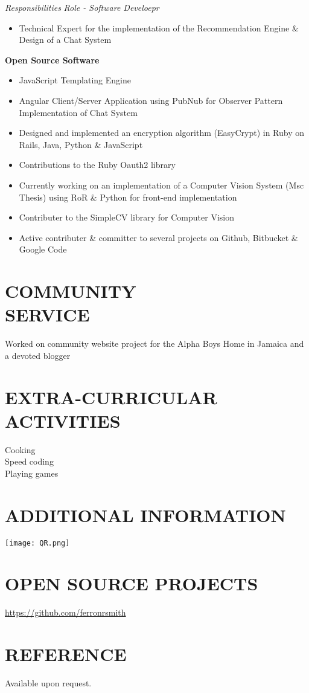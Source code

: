 \documentclass[margin]{res}
\begin{document}
\begin{resume}
	{\sl Responsibilities} \hfill {\sl Role - Software Develoepr}
	\begin{itemize}
	\item Technical Expert for the implementation of the Recommendation Engine \& Design of a Chat System
	\end{itemize}	
	{\bf Open Source Software} \\
	\begin{itemize}
	\item JavaScript Templating Engine
	\item Angular Client/Server Application using PubNub for Observer Pattern Implementation of Chat System
	\item Designed and implemented an encryption algorithm (EasyCrypt) in Ruby on Rails, Java, Python \& JavaScript
	\item Contributions to the Ruby Oauth2 library
	\item Currently working on an implementation of a Computer Vision System (Msc Thesis) using RoR \& Python for front-end implementation
	\item Contributer to the SimpleCV library for Computer Vision
	\item Active contributer \& committer to several projects on Github, Bitbucket \& Google Code
	\end{itemize}

\section{COMMUNITY \\ SERVICE}  Worked on community website project for the Alpha Boys Home in Jamaica and a devoted blogger 


\section{EXTRA-CURRICULAR \\ ACTIVITIES}             
             Cooking \\
             Speed coding \\
             Playing games
             
\section{ADDITIONAL INFORMATION}             
  \texttt{[image: QR.png]}

\section{OPEN SOURCE PROJECTS}             
             \url{https://github.com/ferronrsmith}
       
             
\section{REFERENCE}             
             Available upon request.            

\end{resume}
\end{document}
